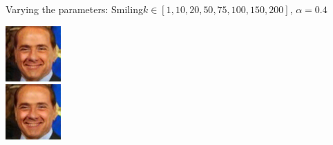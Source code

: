 \documentclass[11pt]{beamer}
\begin{document}
\begin{frame}{Varying the parameters: Smiling}{$k \in [1, 10, 20, 50, 75, 100, 150, 200]$, $\alpha=0.4$}
\begin{minipage}{81px}
	\end{minipage}%
	\begin{minipage}{81px}
		\includegraphics[width=80px]{../pictures/outputs/alpha_k/Smiling/alpha0.4/Silvio_Berlusconi_0023_alpha-0.4_k-502017-02-07_14-12-22.png}\\
		\includegraphics[width=80px]{../pictures/outputs/alpha_k/Smiling/alpha0.4/Silvio_Berlusconi_0023_alpha-0.4_k-2002017-02-07_14-19-11.png}
	\end{minipage}%
\end{frame}
\end{document}
